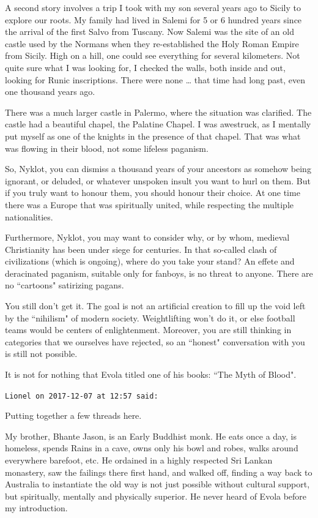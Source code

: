 \begin{footnotesize}
\begin{sffamily}
A second story involves a trip I took with my son several years ago to Sicily to explore our roots. My family had lived in Salemi for 5 or 6 hundred years since the arrival of the first Salvo from Tuscany. Now Salemi was the site of an old castle used by the Normans when they re-established the Holy Roman Empire from Sicily. High on a hill, one could see everything for several kilometers. Not quite sure what I was looking for, I checked the walls, both inside and out, looking for Runic inscriptions. There were none … that time had long past, even one thousand years ago.

There was a much larger castle in Palermo, where the situation was clarified. The castle had a beautiful chapel, the Palatine Chapel. I was awestruck, as I mentally put myself as one of the knights in the presence of that chapel. That was what was flowing in their blood, not some lifeless paganism.

So, Nyklot, you can dismiss a thousand years of your ancestors as somehow being ignorant, or deluded, or whatever unspoken insult you want to hurl on them. But if you truly want to honour them, you should honour their choice. At one time there was a Europe that was spiritually united, while respecting the multiple nationalities.

Furthermore, Nyklot, you may want to consider why, or by whom, medieval Christianity has been under siege for centuries. In that so-called clash of civilizations (which is ongoing), where do you take your stand? An effete and deracinated paganism, suitable only for fanboys, is no threat to anyone. There are no ``cartoons" satirizing pagans.

You still don't get it. The goal is not an artificial creation to fill up the void left by the ``nihilism" of modern society. Weightlifting won't do it, or else football teams would be centers of enlightenment. Moreover, you are still thinking in categories that we ourselves have rejected, so an ``honest" conversation with you is still not possible.

It is not for nothing that Evola titled one of his books: ``The Myth of Blood".


\hfill

\texttt{Lionel on 2017-12-07 at 12:57 said: }

Putting together a few threads here.

My brother, Bhante Jason, is an Early Buddhist monk. He eats once a day, is homeless, spends Rains in a cave, owns only his bowl and robes, walks around everywhere barefoot, etc. He ordained in a highly respected Sri Lankan monastery, saw the failings there first hand, and walked off, finding a way back to Australia to instantiate the old way is not just possible without cultural support, but spiritually, mentally and physically superior. He never heard of Evola before my introduction.


\end{sffamily}
\end{footnotesize}
